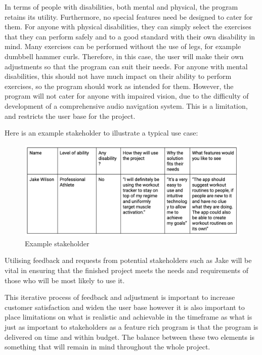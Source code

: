 \documentclass{article}
\begin{document}
In terms of people with disabilities, both mental and physical, the program retains its utility. Furthermore, no special features need be designed to cater for them. For anyone with physical disabilities, they can simply select the exercises that they can perform safely and to a good standard with their own disability in mind. Many exercises can be performed without the use of legs, for example dumbbell hammer curls. Therefore, in this case, the user will make their own adjustments so that the program can suit their needs. For anyone with mental disabilities, this should not have much impact on their ability to perform exercises, so the program should work as intended for them. However, the program will not cater for anyone with impaired vision, due to the difficulty of development of a comprehensive audio navigation system. This is a limitation, and restricts the user base for the project. 

Here is an example stakeholder to illustrate a typical use case:

\begin{figure}[ht]
  \centering
  \includegraphics[width=1\textwidth]{Figure 3.png}
  \caption{Example stakeholder}
\end{figure}

Utilising feedback and requests from potential stakeholders such as Jake will be vital in ensuring that the finished project meets the needs and requirements of those who will be most likely to use it.

This iterative process of feedback and adjustment is important to increase customer satisfaction and widen the user base however it is also important to place limitations on what is realistic and achievable in the timeframe as what is just as important to stakeholders as a feature rich program is that the program is delivered on time and within budget. The balance between these two elements is something that will remain in mind throughout the whole project. 
\end{document}
